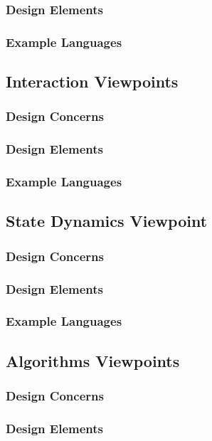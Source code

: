 \documentclass[letterpaper,10pt,titlepage,draftclsnofoot,onecolumn,onesided] {IEEEtran}
\begin{document}
\subsubsection{Design Elements}
\subsubsection{Example Languages}

\subsection{Interaction Viewpoints}
\subsubsection{Design Concerns}
\subsubsection{Design Elements}
\subsubsection{Example Languages}

\subsection{State Dynamics Viewpoint}
\subsubsection{Design Concerns}
\subsubsection{Design Elements}
\subsubsection{Example Languages}

\subsection{Algorithms Viewpoints}
\subsubsection{Design Concerns}
\subsubsection{Design Elements}
\end{document}
